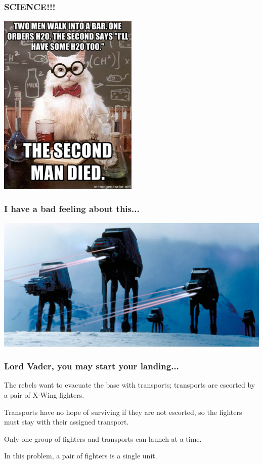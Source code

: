 \begin{frame}
	\frametitle{SCIENCE!!!}

	\begin{center}
		\includegraphics[width=0.5\textwidth]{images/h2o2.jpg}
	\end{center}


\end{frame}


\begin{frame}
\frametitle{I have a bad feeling about this...}

\begin{center}
	\includegraphics[width=\textwidth]{images/hoth.jpg}
\end{center}

\end{frame}


\begin{frame}
\frametitle{Lord Vader, you may start your landing...}

The rebels want to evacuate the base with transports; transports are escorted by a pair of X-Wing fighters. 

Transports have no hope of surviving if they are not escorted, so the fighters must stay with their assigned transport. 

Only one group of fighters and transports can launch at a time. 

In this problem,  a pair of fighters is a single unit.

\end{frame}


